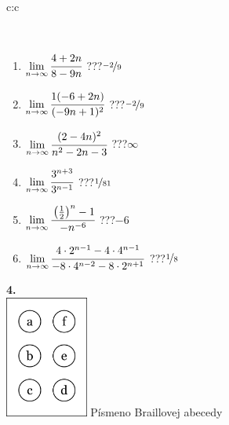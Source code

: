 \documentclass[10pt]{report}
\begin{document}
\begin{tabular}{c:c}
\begin{minipage}[c][104.5mm][t]{0.5\linewidth}
\begin{center}
\begin{minipage}{0.95\linewidth}
\begin{center}
\end{center}
\end{minipage}
\\[1mm]
\begin{minipage}{0.79\linewidth}
\begin{center}
\begin{varwidth}{\linewidth}
\begin{enumerate}
\normalsize
\item $\lim\limits_{n\to\infty}\cfrac{4+2n}{8-9n}$\quad \dotfill\; ???\;\dotfill \quad $\nicefrac{-2}{9}$
\item $\lim\limits_{n\to\infty}\cfrac{1(-6+2n)}{(-9n+1)^2}$\quad \dotfill\; ???\;\dotfill \quad $\nicefrac{-2}{9}$
\item $\lim\limits_{n\to\infty}\cfrac{(2-4n)^2}{n^2-2n-3}$\quad \dotfill\; ???\;\dotfill \quad $\infty$
\item $\lim\limits_{n\to\infty}\cfrac{3^{n+3}}{3^{n-1}}$\quad \dotfill\; ???\;\dotfill \quad $\nicefrac{1}{81}$
\item $\lim\limits_{n\to\infty}\cfrac{\left(\frac{1}{2}\right)^n -1}{-n^{-6}}$\quad \dotfill\; ???\;\dotfill \quad $-6$
\item $\lim\limits_{n\to\infty}\cfrac{4\cdot 2^{n-1}-4\cdot 4^{n-1}}{-8\cdot 4^{n-2}-8\cdot 2^{n+1}}$\quad \dotfill\; ???\;\dotfill \quad $\nicefrac{1}{8}$
\end{enumerate}
\end{varwidth}
\end{center}
\end{minipage}
\begin{minipage}{0.20\linewidth}
\begin{center}
{\Huge\bfseries 4.} \\[2mm]
\includegraphics[height=40mm]{../images/braille.png}
{\small Písmeno Braillovej abecedy}
\end{center}
\end{minipage}
\end{center}
\end{minipage}
%
\end{tabular}
\newpage
\thispagestyle{empty}
\end{document}
